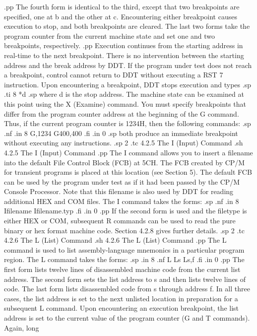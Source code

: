 .pp
The fourth form is identical to the third, except that two 
breakpoints are specified, one at b and the other at c.  
Encountering either breakpoint causes execution to stop, and both 
breakpoints are cleared.  The last two forms take the program 
counter from the current machine state and set one and two 
breakpoints, respectively.
.pp
Execution continues from the starting address in real-time to the 
next breakpoint.  There is no intervention between the starting 
address and the break address by DDT.  If the program under test 
does not reach a breakpoint, control cannot return to DDT without 
executing a RST 7 instruction.  Upon encountering a breakpoint, 
DDT stops execution and types
.sp
.ti 8
*d
.sp
where d is the stop address.  The machine state can be examined 
at this point using the X (Examine) command.  You must 
specify breakpoints that differ from the program counter address 
at the beginning of the G command.  Thus, if the current program 
counter is 1234H, then the following commands:
.sp
.nf
.in 8
G,1234
G400,400
.fi
.in 0
.sp
both produce an immediate breakpoint without executing any 
instructions.
.sp 2
.tc         4.2.5  The I (Input) Command
.sh
4.2.5  The I (Input) Command
.pp
The I command allows you to insert a filename into the default 
File Control Block (FCB) at 5CH.  The FCB created by CP/M for 
transient programs is placed at this location (see Section 5).  
The default FCB can be used by the program under test as if it 
had been passed by the CP/M Console Processor.  Note that this 
filename is also used by DDT for reading additional HEX and COM 
files.  The I command takes the forms:
.sp
.nf
.in 8
Ifilename
Ifilename.typ
.fi
.in 0
.pp
If the second form is used and the filetype is either HEX or COM, 
subsequent R commands can be used to read the pure binary or hex 
format machine code.  Section 4.2.8 gives further details.
.sp 2
.tc         4.2.6  The L (List) Command
.sh
4.2.6  The L (List) Command
.pp
The L command is used to list assembly-language mnemonics in a 
particular program region.  The L command takes the forms:
.sp
.in 8
.nf
L
Ls
Ls,f
.fi
.in 0
.pp
The first form lists twelve lines of disassembled machine code 
from the current list address.  The second form sets the list 
address to s and then lists twelve lines of code.  The last form 
lists disassembled code from s through address f.  In all three 
cases, the list address is set to the next unlisted location in 
preparation for a subsequent L command.  Upon encountering an 
execution breakpoint, the list address is set to the current 
value of the program counter (G and T commands).  Again, long 

